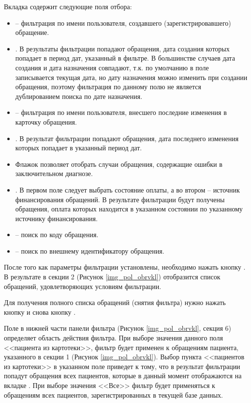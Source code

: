 Вкладка  содержит следующие поля отбора:
\begin{itemize}
 \item {} – фильтрация по имени пользователя, создавшего (зарегистрировавшего) обращение.
 \item {}. В результаты фильтрации попадают обращения, дата создания которых попадает в период дат, указанный в фильтре. В большинстве случаев дата создания и дата назначения совпадают, т.к. по умолчанию в поле  записывается текущая дата, но дату назначения можно изменить при создании обращения, поэтому фильтрация по данному полю не является дублированием поиска по дате назначения.
 \item {} – фильтрация по имени пользователя, внесшего последние изменения в карточку обращения.
 \item {}. В результат фильтрации попадают обращения, дата последнего изменения которых попадает в указанный период дат.
 \item Флажок  позволяет отобрать случаи обращения, содержащие ошибки в заключительном диагнозе.
 \item {}. В первом поле следует выбрать состояние оплаты, а во втором – источник финансирования обращений. В результате фильтрации будут получены обращения, оплата которых находится в указанном состоянии по указанному источнику финансирования.
 \item {} – поиск по коду обращения.
 \item {} – поиск по внешнему идентификатору обращения.
\end{itemize}
 
После того как параметры фильтрации установлены, необходимо нажать кнопку . В результате в секции 2 (Рисунок \ref{img_pol_obrvkl}) отобразится список обращений, удовлетворяющих условиям фильтрации.

Для получения полного списка обращений (снятия фильтра) нужно нажать кнопку  и снова кнопку .

Поле  в нижней части панели фильтра (Рисунок \ref{img_pol_obrvkl}, секция 6) определяет область действия фильтра. При выборе значения данного поля <<пациента из картотеки>>, фильтр будет применен к обращениям пациента, указанного в секции 1 (Рисунок \ref{img_pol_obrvkl}). Выбор пункта <<пациентов из картотеки>> в указанном поле приведет к тому, что в результат фильтрации попадут обращения всех пациентов, которые в данный момент отображаются на вкладке . При выборе значения <<Все>> фильтр будет применяться к обращениям всех пациентов, зарегистрированных в текущей базе данных.

